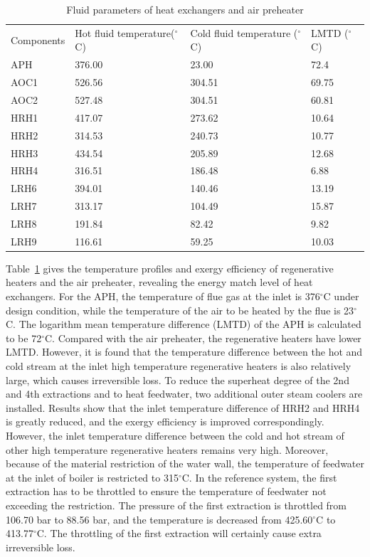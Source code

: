 \documentclass[preprint,12pt]{elsarticle}
\begin{document}
\begin{table}[htbp]
\caption{Fluid parameters of heat exchangers and air preheater}
\label{tab:reheater parameter}
\centering
\begin{tabular}{llll}
\toprule 
\multirow{2}{2cm}{Components} &\multirow{2}{2.7cm}{Hot fluid temperature($^\circ$C)}  & \multirow{2}{3.2cm}{Cold fluid temperature ($^\circ$C)}&\multirow{2}{2.2cm}{LMTD ($^\circ$C)}\tabularnewline
&&&\tabularnewline
\midrule
APH  &  376.00 	& 23.00  & 72.4\tabularnewline
AOC1 &   526.56 & 304.51 & 69.75\tabularnewline
AOC2 &  527.48 	& 304.51 & 60.81\tabularnewline
HRH1 &   417.07 & 273.62 & 10.64\tabularnewline
HRH2 &   314.53 & 240.73 & 10.77\tabularnewline
HRH3 &   434.54 & 205.89 & 12.68\tabularnewline
HRH4 &   316.51 & 186.48 & 6.88\tabularnewline
LRH6 &  394.01 	& 140.46 & 13.19\tabularnewline
LRH7 &   313.17 & 104.49 & 15.87\tabularnewline
LRH8 &   191.84 & 82.42  & 9.82\tabularnewline
LRH9 &   116.61 & 59.25  & 10.03\tabularnewline
\bottomrule
\end{tabular}
\end{table}

Table~\ref{tab:reheater parameter} gives the temperature profiles and exergy efficiency of regenerative heaters and the air preheater, revealing the energy match level of heat exchangers.
For the APH, the temperature of flue gas at the inlet is 376$^\circ$C under design condition, while the temperature of the air to be heated by the flue is 23$^\circ$C.
The logarithm mean temperature difference (LMTD) of the APH is calculated to be 72$^\circ$C.
Compared with the air preheater, the regenerative heaters have lower LMTD.
However, it is found that the temperature difference between the hot and cold stream at the inlet high temperature regenerative heaters is also relatively large, which causes irreversible loss. 
To reduce the superheat degree of the 2nd and 4th extractions and to heat feedwater, two additional outer steam coolers are installed.
Results show that the inlet temperature difference of HRH2 and HRH4 is greatly reduced, and the exergy efficiency is improved correspondingly.
However, the inlet temperature difference between the cold and hot stream of other high temperature regenerative heaters remains very high.
Moreover, because of the material restriction of the water wall, the temperature of feedwater at the inlet of boiler is restricted to 315$^\circ$C. 
In the reference system, the first extraction has to be throttled to ensure the temperature of feedwater not exceeding the restriction.
The pressure of the first extraction is throttled from 106.70 bar to 88.56 bar, and the temperature is decreased from 425.60$^\circ$C to 413.77$^\circ$C. The throttling of the first extraction will certainly cause extra irreversible loss.
\end{document}
